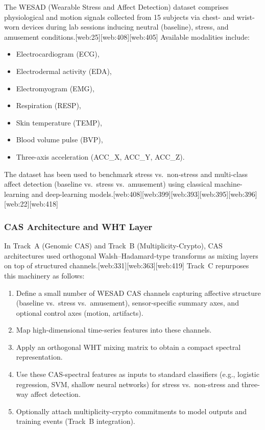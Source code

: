 \documentclass[11pt]{article}
\begin{document}
The WESAD (Wearable Stress and Affect Detection) dataset comprises physiological and motion signals collected from 15 subjects via chest- and wrist-worn devices during lab sessions inducing neutral (baseline), stress, and amusement conditions.\cite{Schmidt2018_WESAD}[web:25][web:408][web:405] Available modalities include:

\begin{itemize}
  \item Electrocardiogram (ECG),
  \item Electrodermal activity (EDA),
  \item Electromyogram (EMG),
  \item Respiration (RESP),
  \item Skin temperature (TEMP),
  \item Blood volume pulse (BVP),
  \item Three-axis acceleration (ACC\_X, ACC\_Y, ACC\_Z).
\end{itemize}

The dataset has been used to benchmark stress vs.\ non-stress and multi-class affect detection (baseline vs.\ stress vs.\ amusement) using classical machine-learning and deep-learning models.\cite{Schmidt2018_WESAD,WESAD_JohnsonGitHub,WESAD_JaganGitHub,WESAD_Siyixu,WESAD_Srovins,WESAD_CrossModality,WESAD_CrossDomain}[web:408][web:399][web:393][web:395][web:396][web:22][web:418]

\subsubsection{CAS Architecture and WHT Layer}

In Track~A (Genomic CAS) and Track~B (Multiplicity-Crypto), CAS architectures used orthogonal Walsh--Hadamard-type transforms as mixing layers on top of structured channels.\cite{WHTOverview,WHTOrthogonal}[web:331][web:363][web:419] Track~C repurposes this machinery as follows:

\begin{enumerate}
  \item Define a small number of WESAD CAS channels capturing affective structure (baseline vs.\ stress vs.\ amusement), sensor-specific summary axes, and optional control axes (motion, artifacts).
  \item Map high-dimensional time-series features into these channels.
  \item Apply an orthogonal WHT mixing matrix to obtain a compact spectral representation.
  \item Use these CAS-spectral features as inputs to standard classifiers (e.g., logistic regression, SVM, shallow neural networks) for stress vs.\ non-stress and three-way affect detection.
  \item Optionally attach multiplicity-crypto commitments to model outputs and training events (Track~B integration).
\end{enumerate}
\end{document}
